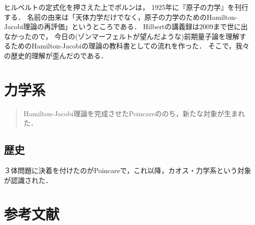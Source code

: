 \documentclass[uplatex, dvipdfmx]{jsreport}
\begin{document}
\begin{history}
    ヒルベルトの定式化を押さえた上でボルンは，
    1925年に『原子の力学』を刊行する．
    名前の由来は「天体力学だけでなく，原子の力学のためのHamilton-Jacobi理論の再評価」というところである．
    Hilbertの講義録は2009まで世に出なかったので，
    今日の(ゾンマーフェルトが望んだような)前期量子論を理解するためのHamilton-Jacobiの理論の教科書としての流れを作った．
    そこで，我々の歴史的理解が歪んだのである．
\end{history}

\chapter{力学系}

\begin{quotation}
    Hamilton-Jacobi理論を完成させたPoincareののち，新たな対象が生まれた．
\end{quotation}

\section{歴史}

３体問題に決着を付けたのがPoincareで，これ以降，カオス・力学系という対象が認識された．

\chapter{参考文献}
\end{document}
